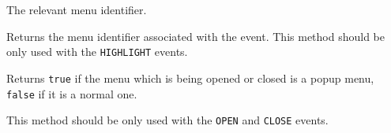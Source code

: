 
The relevant menu identifier.

\label{wxmenueventgetmenuid}


Returns the menu identifier associated with the event. This method should be
only used with the {\tt HIGHLIGHT} events.

\label{wxmenueventispopup}


Returns {\tt true} if the menu which is being opened or closed is a popup menu, 
{\tt false} if it is a normal one.

This method should be only used with the {\tt OPEN} and {\tt CLOSE} events.


